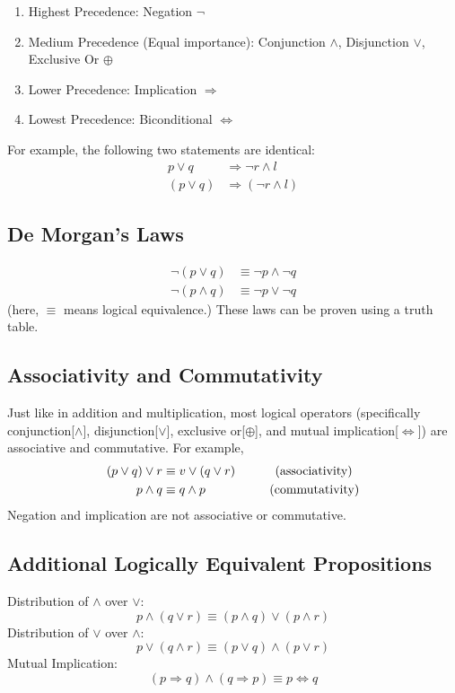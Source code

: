 \documentclass[10pt]{article}
\begin{document}
\begin{enumerate}
	\item Highest Precedence: Negation $\neg$
	\item Medium Precedence (Equal importance): Conjunction $\land$, Disjunction $\lor$, Exclusive Or $\oplus$
	\item Lower Precedence: Implication $\Rightarrow$
	\item Lowest Precedence: Biconditional $\Leftrightarrow$
\end{enumerate}
For example, the following two statements are identical:
\begin{align*}
    p \lor q &\Rightarrow \neg r \land l\\
    (p \lor q) &\Rightarrow (\neg r \land l)
\end{align*}

\subsection*{De Morgan's Laws}
\begin{align*}
    \neg(p \lor q) &\equiv \neg p \land \neg q\\
    \neg(p \land q) &\equiv \neg p \lor \neg q
\end{align*}
(here, $\equiv$ means logical equivalence.)  These laws can be proven using a truth table.

\subsection*{Associativity and Commutativity}
Just like in addition and multiplication, most logical operators (specifically conjunction[$\land$], disjunction[$\lor$], exclusive or[$\oplus$], and mutual implication[$\Leftrightarrow$]) are associative and commutative.  For example,
\begin{align*}
    (p \lor q) \lor r &\equiv v \lor (q \lor r) \hspace{1cm} \text{ (associativity)}\\
    p \land q &\equiv q \land p \hspace{1.8cm} \text{(commutativity)}
\end{align*}
Negation and implication are not associative or commutative.

\subsection*{Additional Logically Equivalent Propositions}
Distribution of $\land$ over $\lor$:
\[p \land (q \lor r) \equiv (p \land q) \lor (p \land r)\]
Distribution of $\lor$ over $\land$:
\[p \lor (q \land r) \equiv (p \lor q) \land (p \lor r)\]
Mutual Implication:
\[(p \Rightarrow q) \land (q \Rightarrow p) \equiv p \Leftrightarrow q\]
\end{document}
